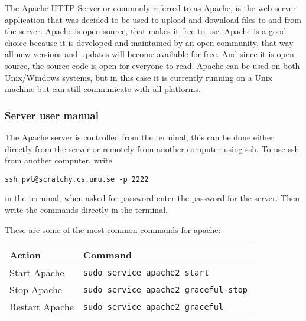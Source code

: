 The Apache HTTP Server or commonly referred to as Apache, is the web server application that was decided to be used to upload and download files to and from the server. Apache is open source, that makes it free to use. Apache is a good choice because it is developed and maintained by an open community, that way all new versions and updates will become available for free. And since it is open source, the source code is open for everyone to read. Apache can be used on both Unix/Windows systems, but in this case it is currently running on a Unix machine but can still communicate with all platforms. 

\subsubsection{Server user manual}
The Apache server is controlled from the terminal, this can be done either directly from the server or remotely from another computer using ssh. To use ssh from another computer, write

\texttt{ssh pvt@scratchy.cs.umu.se -p 2222}

in the terminal, when asked for password enter the password for the server. Then write the commands directly in the terminal.

These are some of the most common commands for apache: \\
\begin{tabular} {| l | l |}
\hline
\textbf{Action} & \textbf{Command} \\
\hline
Start Apache & \texttt{sudo service apache2 start} \\
\hline
Stop Apache & \texttt{sudo service apache2 graceful-stop} \\
\hline
Restart Apache & \texttt{sudo service apache2 graceful} \\
\hline
\end{tabular}
